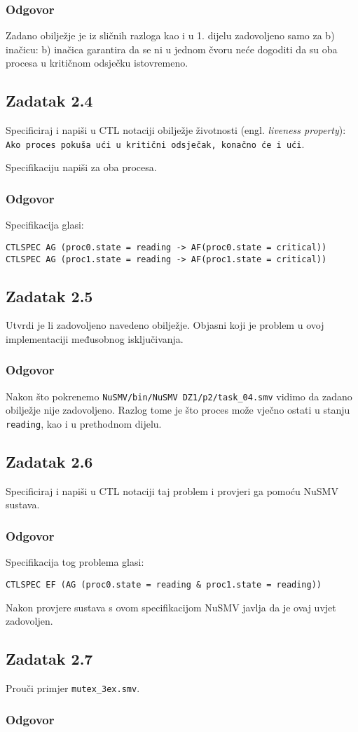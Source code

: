 \documentclass{article}
\newcommand{\zadatak}[1]{\subsection{Zadatak #1}}
\newcommand{\odgovor}{\subsubsection*{Odgovor}}
\newcommand{\code}[1]{\colorbox{blue!11}{\texttt{#1}}}
\begin{document}
\odgovor

Zadano obilježje je iz sličnih razloga kao i u 1. dijelu zadovoljeno samo za b) inačicu: b) inačica garantira da se ni u jednom čvoru neće dogoditi da su oba procesa u kritičnom odsječku istovremeno.


\zadatak{2.4}

Specificiraj i napiši u CTL notaciji obilježje životnosti (engl. \textit{liveness property}):\newline
\code{Ako proces pokuša ući u kritični odsječak, konačno će i ući}.
\newline

\noindent
Specifikaciju napiši za oba procesa. 

\odgovor

Specifikacija glasi:

\begin{verbatim}
CTLSPEC AG (proc0.state = reading -> AF(proc0.state = critical))
CTLSPEC AG (proc1.state = reading -> AF(proc1.state = critical))
\end{verbatim}
\pagebreak  %


\zadatak{2.5}

 Utvrdi je li zadovoljeno navedeno obilježje. Objasni koji je problem u ovoj implementaciji međusobnog isključivanja.
 
\odgovor

Nakon što pokrenemo \code{NuSMV/bin/NuSMV DZ1/p2/task\_04.smv} vidimo da zadano obilježje nije zadovoljeno. Razlog tome je što proces može vječno ostati u stanju \code{reading}, kao i u prethodnom dijelu.
 
 
\zadatak{2.6}

Specificiraj i napiši u CTL notaciji taj problem i provjeri ga pomoću NuSMV sustava.

\odgovor

Specifikacija tog problema glasi:

\begin{verbatim}
CTLSPEC EF (AG (proc0.state = reading & proc1.state = reading))
\end{verbatim}

\noindent
Nakon provjere sustava s ovom specifikacijom NuSMV javlja da je ovaj uvjet zadovoljen.
\pagebreak  %


\zadatak{2.7}

Prouči primjer \code{mutex\_3ex.smv}.

\odgovor
\end{document}
